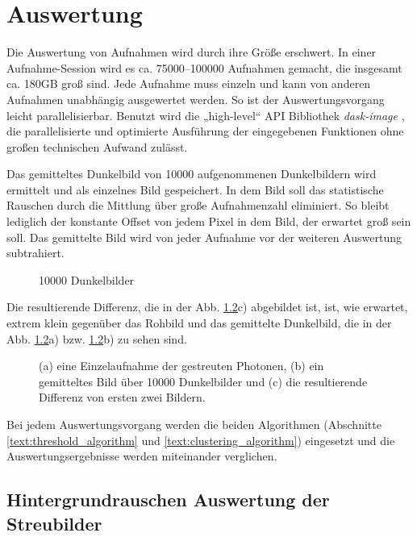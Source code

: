 \chapter{Auswertung}
\label{text:auswertung}
Die Auswertung von Aufnahmen wird durch ihre Größe erschwert. In einer Aufnahme-Session wird es ca. \numrange{75000}{100000} Aufnahmen gemacht, die insgesamt ca. 180GB groß sind. Jede Aufnahme muss einzeln und kann von anderen Aufnahmen unabhängig ausgewertet werden. So ist der Auswertungsvorgang leicht parallelisierbar. Benutzt wird die „high-level“ API Bibliothek \textit{dask-image} \cite{dask-library}, die parallelisierte und optimierte Ausführung der eingegebenen Funktionen ohne großen technischen Aufwand zulässt.

\noindent
Das gemitteltes Dunkelbild von \num{10000} aufgenommenen Dunkelbildern wird ermittelt und als einzelnes Bild gespeichert. In dem Bild soll das statistische Rauschen durch die Mittlung über große Aufnahmenzahl eliminiert. So bleibt lediglich der konstante Offset von jedem Pixel in dem Bild, der erwartet groß sein soll. Das gemittelte Bild wird von jeder Aufnahme vor der weiteren Auswertung subtrahiert.

\noindent
\begin{figure}[H]
    \centering
    
    \caption{\num{10000} Dunkelbilder}
    \label{fig:noise_hist_fit}
\end{figure}

\noindent
Die resultierende Differenz, die in der Abb. \ref{fig:capture_ped_diff}c) abgebildet ist, ist, wie erwartet, extrem klein gegenüber das Rohbild und das gemittelte Dunkelbild, die in der Abb. \ref{fig:capture_ped_diff}a) bzw. \ref{fig:capture_ped_diff}b) zu sehen sind. 
\begin{figure}[H]
    \centering
    
    \caption{(a) eine Einzelaufnahme der gestreuten Photonen, (b) ein gemitteltes Bild über \num{10000} Dunkelbilder und (c) die resultierende Differenz von ersten zwei Bildern.}
    \label{fig:capture_ped_diff}
\end{figure}

\noindent
Bei jedem Auswertungsvorgang werden die beiden Algorithmen (Abschnitte \ref{text:threshold_algorithm} und \ref{text:clustering_algorithm}) eingesetzt und die Auswertungsergebnisse werden miteinander verglichen.
\section{Hintergrundrauschen Auswertung der Streubilder}
\label{text:streuung_counting}
